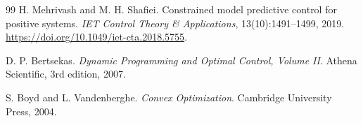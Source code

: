 \documentclass[10pt]{article}
\begin{document}
\begin{thebibliography}{99}
H. Mehrivash and M. H. Shafiei.
\newblock Constrained model predictive control for positive systems.
\newblock \emph{IET Control Theory \& Applications}, 13(10):1491--1499, 2019.
\newblock \url{https://doi.org/10.1049/iet-cta.2018.5755}.

D. P. Bertsekas.
\newblock \emph{Dynamic Programming and Optimal Control, Volume II}.
\newblock Athena Scientific, 3rd edition, 2007.

S. Boyd and L. Vandenberghe.
\newblock \emph{Convex Optimization}.
\newblock Cambridge University Press, 2004.

\end{thebibliography}
\end{document}
